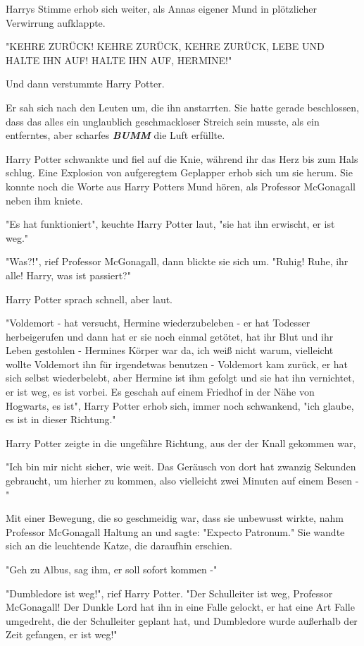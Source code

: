 {Harrys Stimme erhob sich weiter, als Annas eigener Mund in plötzlicher Verwirrung aufklappte.

"KEHRE ZURÜCK! KEHRE ZURÜCK, KEHRE ZURÜCK, LEBE UND HALTE IHN AUF! HALTE IHN AUF, HERMINE!"

Und dann verstummte Harry Potter.

Er sah sich nach den Leuten um, die ihn anstarrten. Sie hatte gerade beschlossen, dass das alles ein unglaublich geschmackloser Streich sein musste, als ein entferntes, aber scharfes \textbf{\emph{BUMM}} die Luft erfüllte.

Harry Potter schwankte und fiel auf die Knie, während ihr das Herz bis zum Hals schlug. Eine Explosion von aufgeregtem Geplapper erhob sich um sie herum. Sie konnte noch die Worte aus Harry Potters Mund hören, als Professor McGonagall neben ihm kniete.

"Es hat funktioniert", keuchte Harry Potter laut, "sie hat ihn erwischt, er ist weg."

"Was?!", rief Professor McGonagall, dann blickte sie sich um. "Ruhig! Ruhe, ihr alle! Harry, was ist passiert?"

Harry Potter sprach schnell, aber laut.

"Voldemort - hat versucht, Hermine wiederzubeleben - er hat Todesser herbeigerufen und dann hat er sie noch einmal getötet, hat ihr Blut und ihr Leben gestohlen - Hermines Körper war da, ich weiß nicht warum, vielleicht wollte Voldemort ihn für irgendetwas benutzen - Voldemort kam zurück, er hat sich selbst wiederbelebt, aber Hermine ist ihm gefolgt und sie hat ihn vernichtet, er ist weg, es ist vorbei. Es geschah auf einem Friedhof in der Nähe von Hogwarts, es ist", Harry Potter erhob sich, immer noch schwankend, "ich glaube, es ist in dieser Richtung."

Harry Potter zeigte in die ungefähre Richtung, aus der der Knall gekommen war,

"Ich bin mir nicht sicher, wie weit. Das Geräusch von dort hat zwanzig Sekunden gebraucht, um hierher zu kommen, also vielleicht zwei Minuten auf einem Besen -"

Mit einer Bewegung, die so geschmeidig war, dass sie unbewusst wirkte, nahm Professor McGonagall Haltung an und sagte: "Expecto Patronum." Sie wandte sich an die leuchtende Katze, die daraufhin erschien.

"Geh zu Albus, sag ihm, er soll sofort kommen -"

"Dumbledore ist weg!", rief Harry Potter. "Der Schulleiter ist weg, Professor McGonagall! Der Dunkle Lord hat ihn in eine Falle gelockt, er hat eine Art Falle umgedreht, die der Schulleiter geplant hat, und Dumbledore wurde außerhalb der Zeit gefangen, er ist weg!"

}
